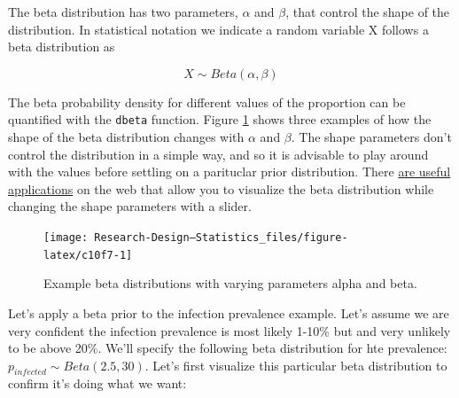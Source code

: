 \documentclass[
]{book}
\begin{document}
The beta distribution has two parameters, \(\alpha\) and \(\beta\), that control the shape of the distribution. In statistical notation we indicate a random variable X follows a beta distribution as

\[
X \sim Beta(\alpha, \beta)
\]

The beta probability density for different values of the proportion can be quantified with the \texttt{dbeta} function. Figure \ref{fig:c10f7} shows three examples of how the shape of the beta distribution changes with \(\alpha\) and \(\beta\). The shape parameters don't control the distribution in a simple way, and so it is advisable to play around with the values before settling on a parituclar prior distribution. There \href{https://mathlets.org/mathlets/beta-distribution/}{are useful applications} on the web that allow you to visualize the beta distribution while changing the shape parameters with a slider.

\begin{figure}

{\centering \texttt{[image: Research-Design---Statistics\_files/figure-latex/c10f7-1]} 

}

\caption{Example beta distributions with varying parameters alpha and beta.}\label{fig:c10f7}
\end{figure}

Let's apply a beta prior to the infection prevalence example. Let's assume we are very confident the infection prevalence is most likely 1-10\% but and very unlikely to be above 20\%. We'll specify the following beta distribution for hte prevalence: \(p_{infected} \sim Beta(2.5, 30)\). Let's first visualize this particular beta distribution to confirm it's doing what we want:
\end{document}
